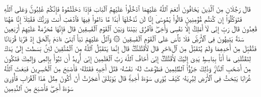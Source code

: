 \stopbuffer%
\startbuffer[\q:5:23]
قَالَ رَجُلَانِ مِنَ ٱلَّذِینَ یَخَافُونَ أَنۡعَمَ ٱللَّهُ عَلَیۡهِمَا ٱدۡخُلُوا۟ عَلَیۡهِمُ ٱلۡبَابَ فَإِذَا دَخَلۡتُمُوهُ فَإِنَّكُمۡ غَٰلِبُونَۚ وَعَلَى ٱللَّهِ فَتَوَكَّلُوۤا۟ إِن كُنتُم مُّؤۡمِنِینَ%
\stopbuffer%
\startbuffer[\q:5:24]
قَالُوا۟ یَٰمُوسَىٰۤ إِنَّا لَن نَّدۡخُلَهَاۤ أَبَدࣰا مَّا دَامُوا۟ فِیهَا فَٱذۡهَبۡ أَنتَ وَرَبُّكَ فَقَٰتِلَاۤ إِنَّا هَٰهُنَا قَٰعِدُونَ%
\stopbuffer%
\startbuffer[\q:5:25]
قَالَ رَبِّ إِنِّی لَاۤ أَمۡلِكُ إِلَّا نَفۡسِی وَأَخِیۖ فَٱفۡرُقۡ بَیۡنَنَا وَبَیۡنَ ٱلۡقَوۡمِ ٱلۡفَٰسِقِینَ%
\stopbuffer%
\startbuffer[\q:5:26]
قَالَ فَإِنَّهَا مُحَرَّمَةٌ عَلَیۡهِمۡۛ أَرۡبَعِینَ سَنَةࣰۛ یَتِیهُونَ فِی ٱلۡأَرۡضِۚ فَلَا تَأۡسَ عَلَى ٱلۡقَوۡمِ ٱلۡفَٰسِقِینَ%
\stopbuffer%
\startbuffer[\q:5:27]
۞ وَٱتۡلُ عَلَیۡهِمۡ نَبَأَ ٱبۡنَیۡ ءَادَمَ بِٱلۡحَقِّ إِذۡ قَرَّبَا قُرۡبَانࣰا فَتُقُبِّلَ مِنۡ أَحَدِهِمَا وَلَمۡ یُتَقَبَّلۡ مِنَ ٱلۡءَاخَرِ قَالَ لَأَقۡتُلَنَّكَۖ قَالَ إِنَّمَا یَتَقَبَّلُ ٱللَّهُ مِنَ ٱلۡمُتَّقِینَ%
\stopbuffer%
\startbuffer[\q:5:28]
لَئِنۢ بَسَطتَ إِلَیَّ یَدَكَ لِتَقۡتُلَنِی مَاۤ أَنَا۠ بِبَاسِطࣲ یَدِیَ إِلَیۡكَ لِأَقۡتُلَكَۖ إِنِّیۤ أَخَافُ ٱللَّهَ رَبَّ ٱلۡعَٰلَمِینَ%
\stopbuffer%
\startbuffer[\q:5:29]
إِنِّیۤ أُرِیدُ أَن تَبُوۤأَ بِإِثۡمِی وَإِثۡمِكَ فَتَكُونَ مِنۡ أَصۡحَٰبِ ٱلنَّارِۚ وَذَٰلِكَ جَزَٰۤؤُا۟ ٱلظَّٰلِمِینَ%
\stopbuffer%
\startbuffer[\q:5:30]
فَطَوَّعَتۡ لَهُۥ نَفۡسُهُۥ قَتۡلَ أَخِیهِ فَقَتَلَهُۥ فَأَصۡبَحَ مِنَ ٱلۡخَٰسِرِینَ%
\stopbuffer%
\startbuffer[\q:5:31]
فَبَعَثَ ٱللَّهُ غُرَابࣰا یَبۡحَثُ فِی ٱلۡأَرۡضِ لِیُرِیَهُۥ كَیۡفَ یُوَٰرِی سَوۡءَةَ أَخِیهِۚ قَالَ یَٰوَیۡلَتَىٰۤ أَعَجَزۡتُ أَنۡ أَكُونَ مِثۡلَ هَٰذَا ٱلۡغُرَابِ فَأُوَٰرِیَ سَوۡءَةَ أَخِیۖ فَأَصۡبَحَ مِنَ ٱلنَّٰدِمِینَ%
\stopbuffer%
